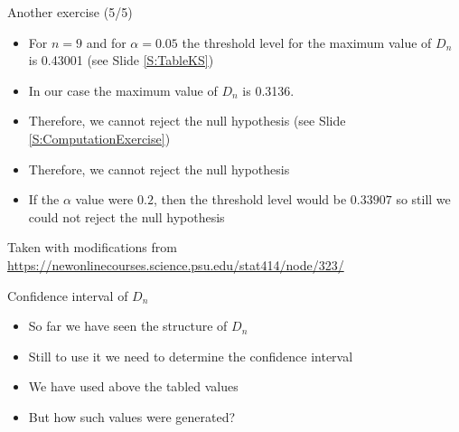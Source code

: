 \documentclass{beamer}
\begin{document}
\begin{frame}
{\centerline{Another exercise (5/5)}}

\begin{itemize}
    \item For $n=9$ and for $\alpha=0.05$ the threshold level for the maximum value of $D_n$ is 0.43001 (see Slide \ref{S:TableKS})
    \item In our case the maximum value of $D_n$ is 0.3136.
    \item Therefore, we cannot reject the null hypothesis (see Slide \ref{S:ComputationExercise})
    \item Therefore, we cannot reject the null hypothesis
    \item If the $\alpha$ value were $0.2$, then the threshold level would be $0.33907$ so still we could not reject the null hypothesis
\end{itemize}

\begin{center}
\tiny{Taken with modifications from \url{https://newonlinecourses.science.psu.edu/stat414/node/323/}}
\end{center}
\end{frame}



\begin{frame}
{\centerline{Confidence interval of $D_n$}}

\begin{itemize}
    \item So far we have seen the structure of $D_n$
    \item Still to use it we need to determine the confidence interval
    \item We have used above the tabled values
    \item But how such values were generated?
\end{itemize}



\end{frame}
\end{document}
